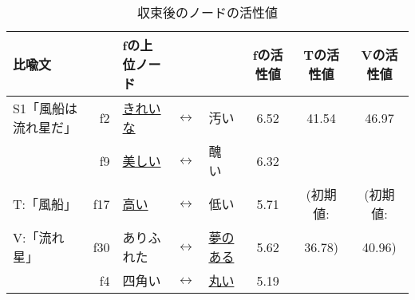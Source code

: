 \begin{table}[tb] 
\caption{収束後のノードの活性値}
\label{tbl:hyo5}
\begin{center}
\begin{footnotesize}
\begin{tabular}{|l|rlll|c|c|c|}
  \hline
   比喩文   & & fの上位ノード &  & & fの活性値 & Tの活性値 & Vの活性値  \\
  \hline
 S1「風船は流れ星だ」 & f2 & \underline{きれいな}  &
$\longleftrightarrow$ &   汚い &  6.52 & 41.54 & 46.97 \\
           & f9 & \underline{美しい}    & $\longleftrightarrow$ &   醜
い & 6.32 &  &  \\
    \hspace{0.8cm}T:\hspace{0.1cm}「風船」                & f17 &
\underline{高い}      & $\longleftrightarrow$ &   低い & 5.71 & (初期値: & (初期値: \\
    \hspace{0.8cm}V:\hspace{0.1cm}「流れ星」                & f30 & ありふれた& $\longleftrightarrow$ &  \underline{夢のある} 
& 5.62 & 36.78) & 40.96)\\
                    & f4 & 四角い   & $\longleftrightarrow$ &
\underline{丸い} & 5.19 & & \\ \hline
\end{tabular}
\end{footnotesize}
\end{center}
\end{table}


